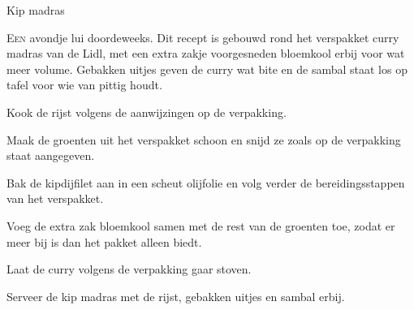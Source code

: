 \begin{recipe}{Kip madras}


\lettrine{E}{en} avondje lui doordeweeks. Dit recept is gebouwd rond het
verspakket curry madras van de Lidl, met een extra zakje voorgesneden
bloemkool erbij voor wat meer volume. Gebakken uitjes geven de curry wat
bite en de sambal staat los op tafel voor wie van pittig houdt.

\begin{ingredients}
\end{ingredients}

\begin{steps}
  \item Kook de rijst volgens de aanwijzingen op de verpakking.
  \item Maak de groenten uit het verspakket schoon en snijd ze zoals op de
        verpakking staat aangegeven.
  \item Bak de kipdijfilet aan in een scheut olijfolie en volg verder de
        bereidingsstappen van het verspakket.
  \item Voeg de extra zak bloemkool samen met de rest van de groenten toe,
        zodat er meer bij is dan het pakket alleen biedt.
  \item Laat de curry volgens de verpakking gaar stoven.
  \item Serveer de kip madras met de rijst, gebakken uitjes en sambal
        erbij.
\end{steps}
\end{recipe}

